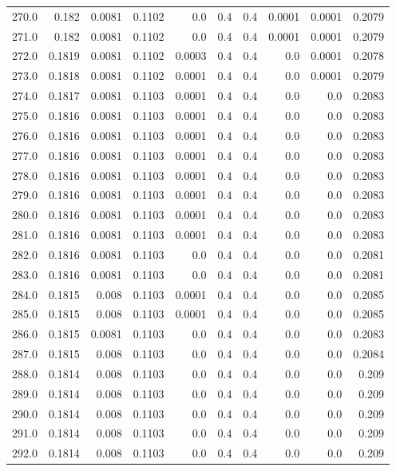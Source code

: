 \begin{longtable}{lrrrrrrrrr}
270.0 & 0.182 & 0.0081 & 0.1102 & 0.0 & 0.4 & 0.4 & 0.0001 & 0.0001 & 0.2079 \\
271.0 & 0.182 & 0.0081 & 0.1102 & 0.0 & 0.4 & 0.4 & 0.0001 & 0.0001 & 0.2079 \\
272.0 & 0.1819 & 0.0081 & 0.1102 & 0.0003 & 0.4 & 0.4 & 0.0 & 0.0001 & 0.2078 \\
273.0 & 0.1818 & 0.0081 & 0.1102 & 0.0001 & 0.4 & 0.4 & 0.0 & 0.0001 & 0.2079 \\
274.0 & 0.1817 & 0.0081 & 0.1103 & 0.0001 & 0.4 & 0.4 & 0.0 & 0.0 & 0.2083 \\
275.0 & 0.1816 & 0.0081 & 0.1103 & 0.0001 & 0.4 & 0.4 & 0.0 & 0.0 & 0.2083 \\
276.0 & 0.1816 & 0.0081 & 0.1103 & 0.0001 & 0.4 & 0.4 & 0.0 & 0.0 & 0.2083 \\
277.0 & 0.1816 & 0.0081 & 0.1103 & 0.0001 & 0.4 & 0.4 & 0.0 & 0.0 & 0.2083 \\
278.0 & 0.1816 & 0.0081 & 0.1103 & 0.0001 & 0.4 & 0.4 & 0.0 & 0.0 & 0.2083 \\
279.0 & 0.1816 & 0.0081 & 0.1103 & 0.0001 & 0.4 & 0.4 & 0.0 & 0.0 & 0.2083 \\
280.0 & 0.1816 & 0.0081 & 0.1103 & 0.0001 & 0.4 & 0.4 & 0.0 & 0.0 & 0.2083 \\
281.0 & 0.1816 & 0.0081 & 0.1103 & 0.0001 & 0.4 & 0.4 & 0.0 & 0.0 & 0.2083 \\
282.0 & 0.1816 & 0.0081 & 0.1103 & 0.0 & 0.4 & 0.4 & 0.0 & 0.0 & 0.2081 \\
283.0 & 0.1816 & 0.0081 & 0.1103 & 0.0 & 0.4 & 0.4 & 0.0 & 0.0 & 0.2081 \\
284.0 & 0.1815 & 0.008 & 0.1103 & 0.0001 & 0.4 & 0.4 & 0.0 & 0.0 & 0.2085 \\
285.0 & 0.1815 & 0.008 & 0.1103 & 0.0001 & 0.4 & 0.4 & 0.0 & 0.0 & 0.2085 \\
286.0 & 0.1815 & 0.0081 & 0.1103 & 0.0 & 0.4 & 0.4 & 0.0 & 0.0 & 0.2083 \\
287.0 & 0.1815 & 0.008 & 0.1103 & 0.0 & 0.4 & 0.4 & 0.0 & 0.0 & 0.2084 \\
288.0 & 0.1814 & 0.008 & 0.1103 & 0.0 & 0.4 & 0.4 & 0.0 & 0.0 & 0.209 \\
289.0 & 0.1814 & 0.008 & 0.1103 & 0.0 & 0.4 & 0.4 & 0.0 & 0.0 & 0.209 \\
290.0 & 0.1814 & 0.008 & 0.1103 & 0.0 & 0.4 & 0.4 & 0.0 & 0.0 & 0.209 \\
291.0 & 0.1814 & 0.008 & 0.1103 & 0.0 & 0.4 & 0.4 & 0.0 & 0.0 & 0.209 \\
292.0 & 0.1814 & 0.008 & 0.1103 & 0.0 & 0.4 & 0.4 & 0.0 & 0.0 & 0.209 \\

\end{longtable}
